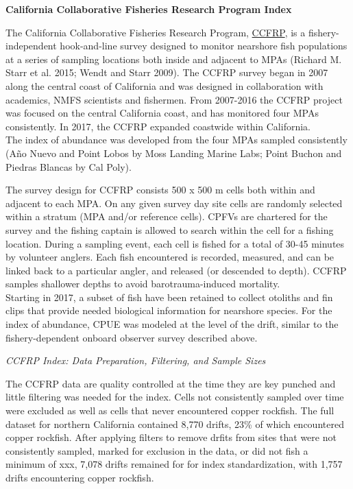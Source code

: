 \documentclass[11pt,
  english,
  letterpaper,
]{article}
\begin{document}
\textbf{California Collaborative Fisheries Research Program Index}

The California Collaborative Fisheries Research Program, \href{https://www.mlml.calstate.edu/ccfrp/}{CCFRP}, is a fishery-independent hook-and-line survey designed to monitor nearshore fish populations at a series of sampling locations both inside and adjacent to MPAs (Richard M. Starr et al. 2015; Wendt and Starr 2009). The CCFRP survey began in 2007 along the central coast of California and was designed in collaboration with academics, NMFS scientists and fishermen. From 2007-2016 the CCFRP project was focused on the central California coast, and has monitored four MPAs consistently. In 2017, the CCFRP expanded coastwide within California.\\
The index of abundance was developed from the four MPAs sampled consistently (Año Nuevo and Point Lobos by Moss Landing Marine Labs; Point Buchon and Piedras Blancas by Cal Poly).

The survey design for CCFRP consists 500 x 500 m cells both within and adjacent to each MPA. On any given survey day site cells are randomly selected within a stratum (MPA and/or reference cells). CPFVs are chartered for the survey and the fishing captain is allowed to search within the cell for a fishing location. During a sampling event, each cell is fished for a total of 30-45 minutes by volunteer anglers. Each fish encountered is recorded, measured, and can be linked back to a particular angler, and released (or descended to depth). CCFRP samples shallower depths to avoid barotrauma-induced mortality.\\
Starting in 2017, a subset of fish have been retained to collect otoliths and fin clips that provide needed biological information for nearshore species. For the index of abundance, CPUE was modeled at the level of the drift, similar to the fishery-dependent onboard observer survey described above.

\emph{CCFRP Index: Data Preparation, Filtering, and Sample Sizes}

The CCFRP data are quality controlled at the time they are key punched and little filtering was needed for the index. Cells not consistently sampled over time were excluded as well as cells that never encountered copper rockfish. The full dataset for northern California contained 8,770 drifts, 23\% of which encountered copper rockfish. After applying filters to remove drfits from sites that were not consistently sampled, marked for exclusion in the data, or did not fish a minimum of xxx, 7,078 drifts remained for for index standardization, with 1,757 drifts encountering copper rockfish.
\end{document}
